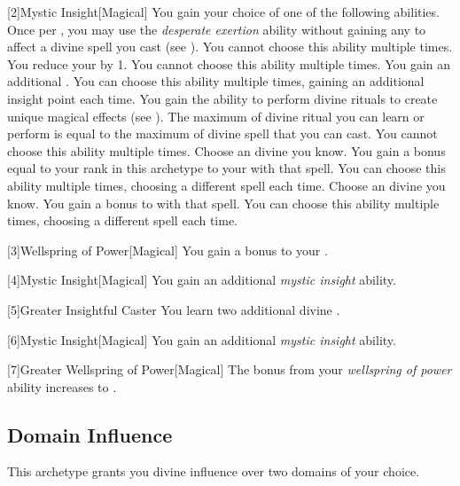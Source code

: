         [2]{Mystic Insight}[Magical]
        You gain your choice of one of the following abilities.
        {
             Once per , you may use the \textit{desperate exertion} ability without gaining any  to affect a divine spell you cast (see ).
                You cannot choose this ability multiple times.
             You reduce your  by 1.
                You cannot choose this ability multiple times.
             You gain an additional .
                You can choose this ability multiple times, gaining an additional insight point each time.
             You gain the ability to perform divine rituals to create unique magical effects (see ).
                The maximum  of divine ritual you can learn or perform is equal to the maximum  of divine spell that you can cast.
                You cannot choose this ability multiple times.
             Choose an divine  you know.
                You gain a bonus equal to your rank in this archetype to your  with that spell.
                You can choose this ability multiple times, choosing a different spell each time.
             Choose an divine  you know.
                You gain a  bonus to  with that spell.
                You can choose this ability multiple times, choosing a different spell each time.
        }

        [3]{Wellspring of Power}[Magical]
        You gain a  bonus to your  .

        [4]{Mystic Insight}[Magical]
        You gain an additional \textit{mystic insight} ability.

        [5]{Greater Insightful Caster} You learn two additional divine .

        [6]{Mystic Insight}[Magical]
        You gain an additional \textit{mystic insight} ability.

        [7]{Greater Wellspring of Power}[Magical]
        The bonus from your \textit{wellspring of power} ability increases to .

    \newpage
    \subsection{Domain Influence}
        This archetype grants you divine influence over two domains of your choice.

